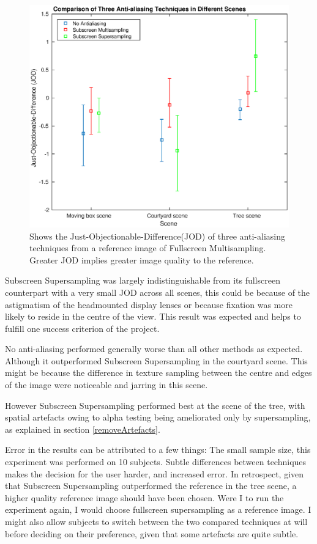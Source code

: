 \documentclass[12pt,a4paper,twoside,openright]{report}
\begin{document}
\begin{figure}[tbh]
\centerline{\includegraphics[width=14cm]{figs/jod.eps}}
\caption{Shows the Just-Objectionable-Difference(JOD) of three anti-aliasing techniques from a reference image of Fullscreen Multisampling. Greater JOD implies greater image quality to the reference.}
\label{fig:jod}
\end{figure}

Subscreen Supersampling was largely indistinguishable from its fullscreen counterpart with a very small JOD across all scenes, this could be because of the astigmatism of the headmounted display lenses or because fixation was more likely to reside in the centre of the view. This result was expected and helps to fulfill one success criterion of the project. 

No anti-aliasing performed generally worse than all other methods as expected. Although it outperformed Subscreen Supersampling in the courtyard scene. This might be because the difference in texture sampling between the centre and edges of the image were noticeable and jarring in this scene.

However Subscreen Supersampling performed best at the scene of the tree, with spatial artefacts owing to alpha testing being ameliorated only by supersampling, as explained in section \ref{removeArtefacts}.

Error in the results can be attributed to a few things: The small sample size, this experiment was performed on 10 subjects. Subtle differences between techniques makes the decision for the user harder, and increased error. 
In retrospect, given that Subscreen Supersampling outperformed the reference in the tree scene, a higher quality reference image should have been chosen. Were I to run the experiment again, I would choose fullscreen supersampling as a reference image. I might also allow subjects to switch between the two compared techniques at will before deciding on their preference, given that some artefacts are quite subtle.
\end{document}
